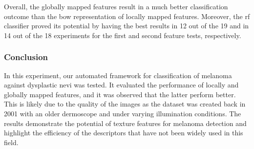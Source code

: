 Overall, the globally mapped features result in a much better classification outcome than the \ac{bow} representation of locally mapped features.
Moreover, the \ac{rf} classifier proved its potential by having the best results in 12 out of the 19 and in 14 out of the 18 experiments for the first and second feature tests, respectively.

\subsubsection{Conclusion}
In this experiment, our automated framework for classification of melanoma against dysplastic nevi was tested.
It evaluated the performance of locally and globally mapped features, and it was observed that the latter perform better.
This is likely due to the quality of the images as the dataset was created back in 2001 with an older dermoscope and under varying illumination conditions.
The results demonstrate the potential of texture features for melanoma detection and highlight the efficiency of the descriptors that have not been widely used in this field.

